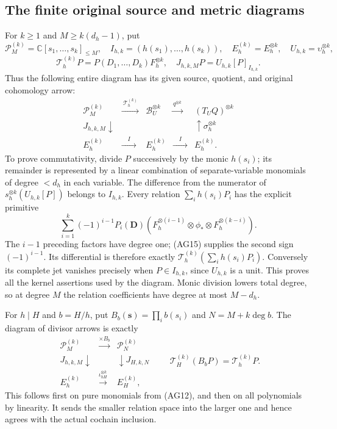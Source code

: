 \subsection{The finite original source and metric diagrams}

For $k\ge1$ and $M\ge k(d_h-1)$, put
\[
 \mathcal P_M^{(k)}=\mathbb C[s_1,\ldots,s_k]_{\le M},\quad
 I_{h,k}=(h(s_1),\ldots,h(s_k)),\quad
 E_h^{(k)}=E_h^{\otimes k},\quad
 U_{h,k}=\upsilon_h^{\otimes k},
\]
\[
 \mathcal T_h^{(k)}P=P(D_1,\ldots,D_k)F_h^{\otimes k},
 \quad J_{h,k,M}P=U_{h,k}[P]_{I_{h,k}}.
 \tag{AG19}
\]
Thus the following entire diagram has its given source, quotient,
and original cohomology arrow:
\[
 \begin{array}{ccccc}
 \mathcal P_M^{(k)}&\xrightarrow{\ \mathcal T_h^{(k)}\ }
   &\mathscr B_U^{\otimes k}&\xrightarrow{q^{\otimes k}}
   &(T_UQ)^{\otimes k}\\
 J_{h,k,M}\downarrow&&&&\uparrow\sigma_h^{\otimes k}\\
 E_h^{(k)}&\xrightarrow{\quad I\quad}&E_h^{(k)}
      &\xrightarrow{\quad I\quad}&E_h^{(k)}.
 \end{array}\tag{AG20}
\]
To prove commutativity, divide $P$ successively by the monic
$h(s_i)$; its remainder is represented by a linear combination
of separate-variable monomials of degree $<d_h$ in each variable.
The difference from the numerator of
$s_h^{\otimes k}(U_{h,k}[P])$ belongs to $I_{h,k}$.
Every relation $\sum_i h(s_i)P_i$ has the explicit primitive
\[
 \sum_{i=1}^k(-1)^{i-1}P_i(\mathbf D)
 (F_h^{\otimes(i-1)}\otimes\phi_*\otimes
                       F_h^{\otimes(k-i)}).
 \tag{AG21}
\]
The $i-1$ preceding factors have degree one; (AG15) supplies the
second sign $(-1)^{i-1}$.  Its differential is therefore exactly
$\mathcal T_h^{(k)}(\sum_i h(s_i)P_i)$.
Conversely its complete jet vanishes precisely when $P\in I_{h,k}$,
since $U_{h,k}$ is a unit.  This proves all the kernel assertions
used by the diagram.  Monic division lowers total degree, so at
degree $M$ the relation coefficients have degree at most $M-d_h$.

For $h\mid H$ and $b=H/h$, put $B_b(\mathbf s)=\prod_i b(s_i)$
and $N=M+k\deg b$.  The diagram of divisor arrows is exactly
\[
 \begin{array}{ccc}
 \mathcal P_M^{(k)}&\xrightarrow{\times B_b}&\mathcal P_N^{(k)}\\
 J_{h,k,M}\downarrow&&\downarrow J_{H,k,N}\\
 E_h^{(k)}&\xrightarrow{\iota_{hH}^{\otimes k}}&E_H^{(k)},
 \end{array}
 \qquad
 \mathcal T_H^{(k)}(B_bP)=\mathcal T_h^{(k)}P.
 \tag{AG22}
\]
This follows first on pure monomials from (AG12), and then on all
polynomials by linearity.  It sends the smaller relation space into
the larger one and hence agrees with the actual cochain inclusion.

